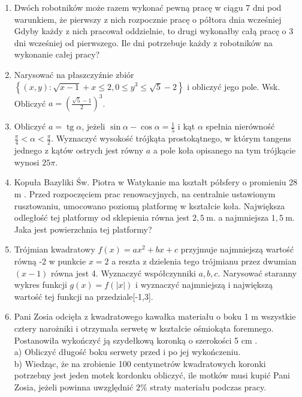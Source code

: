 \documentclass[10pt]{article}
\begin{document}
\begin{enumerate}
  \item Dwóch robotników może razem wykonać pewną pracę w ciągu 7 dni pod warunkiem, że pierwszy z nich rozpocznie pracę o półtora dnia wcześniej Gdyby każdy z nich pracował oddzielnie, to drugi wykonałby całą pracę o 3 dni wcześniej od pierwszego. Ile dni potrzebuje każdy z robotników na wykonanie całej pracy?
  \item Narysować na płaszczyźnie zbiór $\left\{(x, y): \sqrt{x-1}+x \leqslant 2,0 \leqslant y^{3} \leqslant \sqrt{5}-2\right\}$ i obliczyć jego pole. Wsk. Obliczyć $a=\left(\frac{\sqrt{5}-1}{2}\right)^{3}$.
  \item Obliczyć $a=\operatorname{tg} \alpha$, jeżeli $\sin \alpha-\cos \alpha=\frac{1}{5}$ i kąt $\alpha$ spełnia nierówność $\frac{\pi}{4}<\alpha<\frac{\pi}{2}$. Wyznaczyć wysokość trójkąta prostokątnego, w którym tangens jednego z kątów ostrych jest równy $a$ a pole koła opisanego na tym trójkącie wynosi $25 \pi$.
  \item Kopuła Bazyliki Św. Piotra w Watykanie ma kształt półsfery o promieniu 28 m . Przed rozpoczęciem prac renowacyjnych, na centralnie ustawionym rusztowaniu, umocowano poziomą platformę w kształcie koła. Największa odległość tej platformy od sklepienia równa jest $2,5 \mathrm{~m}$. a najmniejsza $1,5 \mathrm{~m}$. Jaka jest powierzchnia tej platformy?
  \item Trójmian kwadratowy $f(x)=a x^{2}+b x+c$ przyjmuje najmniejszą wartość równą -2 w punkcie $x=2$ a reszta z dzielenia tego trójmianu przez dwumian $(x-1)$ równa jest 4. Wyznaczyć współczynniki $a, b, c$. Narysować staranny wykres funkcji $g(x)=f(|x|)$ i wyznaczyć najmniejszą i największą wartość tej funkcji na przedziale[-1,3].
  \item Pani Zosia odcięła z kwadratowego kawałka materiału o boku 1 m wszystkie cztery narożniki i otrzymała serwetę w kształcie ośmiokąta foremnego. Postanowiła wykończyć ją szydełkową koronką o szerokości 5 cm .\\
a) Obliczyć długość boku serwety przed i po jej wykończeniu.\\
b) Wiedząc, że na zrobienie 100 centymetrów kwadratowych koronki potrzebny jest jeden motek kordonku obliczyć, ile motków musi kupić Pani Zosia, jeżeli powinna uwzględnić $2 \%$ straty materiału podczas pracy.
\end{enumerate}
\end{document}
